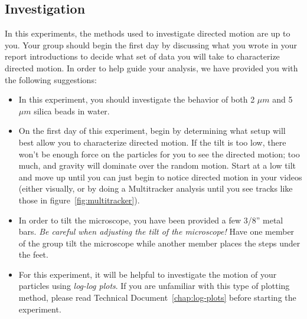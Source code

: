 \subsection*{Investigation}
In this experiments, the methods used to investigate directed motion are up to you.
Your group should begin the first day by discussing what you wrote in your report introductions to decide what set of data you will take to characterize directed motion.
In order to help guide your analysis, we have provided you with the following suggestions:
\begin{itemize}
\item In this experiment, you should investigate the behavior of both 2 $\mu m$ and 5 $\mu m$ silica beads in water.
\item On the first day of this experiment, begin by determining what setup will best allow you to characterize directed motion. If the tilt is too low, there won't be enough force on the particles for you to see the directed motion; too much, and gravity will dominate over the random motion. Start at a low tilt and move up until you can just begin to notice directed motion in your videos (either visually, or by doing a Multitracker analysis until you see tracks like those in figure~\ref{fig:multitracker}).
\item In order to tilt the microscope, you have been provided a few 3/8'' metal bars. \emph{Be careful when adjusting the tilt of the microscope!} Have one member of the group tilt the microscope while another member places the steps under the feet.
\item For this experiment, it will be helpful to investigate the motion of your particles using \emph{log-log plots}. If you are unfamiliar with this type of plotting method, please read Technical Document~\ref{chap:log-plots} before starting the experiment.
\end{itemize}
%
